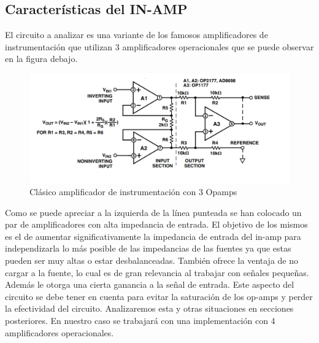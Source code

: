 	\subsection{Características del IN-AMP}
	El circuito a analizar es una variante de los famosos amplificadores de instrumentación que utilizan 3 amplificadores operacionales que se puede observar en la figura debajo.
	\begin{figure}[H]
		\centering		
		\includegraphics[width=\linewidth]{./ImagenesVarias/inAmp3Opamp}
		\caption{Clásico amplificador de instrumentación con 3 Opamps}
	\end{figure}
		
	Como se puede apreciar a la izquierda de la línea punteada se han colocado un par de amplificadores con alta impedancia de entrada. El objetivo de los mismos es el de aumentar significativamente la impedancia de entrada del in-amp para independizarla lo más posible de las impedancias de las fuentes ya que estas pueden ser muy altas o estar desbalanceadas. También ofrece la ventaja de no cargar a la fuente, lo cual es de gran relevancia al trabajar con señales pequeñas. Además le otorga una cierta ganancia a la señal de entrada. Este aspecto del circuito se debe tener en cuenta para evitar la saturación de los op-amps y perder la efectividad del circuito. Analizaremos esta y otras situaciones en secciones posteriores.
	En nuestro caso se trabajará con una implementación con 4 amplificadores operacionales.
	
